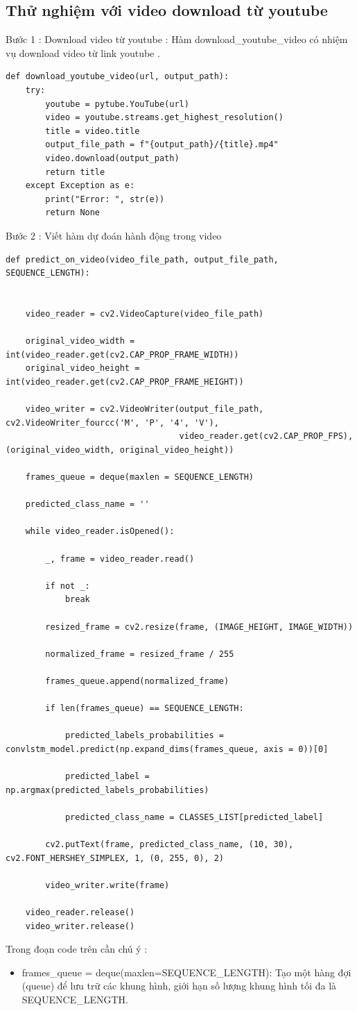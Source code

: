 \subsection{Thử nghiệm với video download từ youtube}
Bước 1 : Download video từ youtube : 
Hàm download\_youtube\_video có nhiệm vụ download video từ link youtube .
\begin{lstlisting}[style=codePython]
def download_youtube_video(url, output_path):
    try:
        youtube = pytube.YouTube(url)
        video = youtube.streams.get_highest_resolution()
        title = video.title
        output_file_path = f"{output_path}/{title}.mp4"
        video.download(output_path)
        return title
    except Exception as e:
        print("Error: ", str(e))
        return None
\end{lstlisting}

Bước 2 : Viết hàm dự đoán hành động trong video 

\begin{lstlisting}[style=codePython]
def predict_on_video(video_file_path, output_file_path, SEQUENCE_LENGTH):


    video_reader = cv2.VideoCapture(video_file_path)

    original_video_width = int(video_reader.get(cv2.CAP_PROP_FRAME_WIDTH))
    original_video_height = int(video_reader.get(cv2.CAP_PROP_FRAME_HEIGHT))

    video_writer = cv2.VideoWriter(output_file_path, cv2.VideoWriter_fourcc('M', 'P', '4', 'V'),
                                   video_reader.get(cv2.CAP_PROP_FPS), (original_video_width, original_video_height))

    frames_queue = deque(maxlen = SEQUENCE_LENGTH)

    predicted_class_name = ''

    while video_reader.isOpened():

        _, frame = video_reader.read()

        if not _:
            break

        resized_frame = cv2.resize(frame, (IMAGE_HEIGHT, IMAGE_WIDTH))

        normalized_frame = resized_frame / 255

        frames_queue.append(normalized_frame)

        if len(frames_queue) == SEQUENCE_LENGTH:

            predicted_labels_probabilities = convlstm_model.predict(np.expand_dims(frames_queue, axis = 0))[0]

            predicted_label = np.argmax(predicted_labels_probabilities)

            predicted_class_name = CLASSES_LIST[predicted_label]

        cv2.putText(frame, predicted_class_name, (10, 30), cv2.FONT_HERSHEY_SIMPLEX, 1, (0, 255, 0), 2)

        video_writer.write(frame)

    video_reader.release()
    video_writer.release()
\end{lstlisting}


Trong đoạn code trên cần chú ý  : 
\begin{itemize}
    \item frames\_queue = deque(maxlen=SEQUENCE\_LENGTH): Tạo một hàng đợi (queue) để lưu trữ các khung hình, giới hạn số lượng khung hình tối đa là SEQUENCE\_LENGTH. 
\end{itemize}
